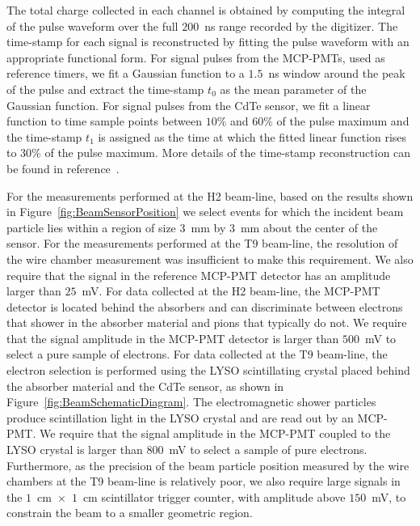 The total charge collected in each channel is obtained by computing the integral of the pulse
waveform over the full $200$~ns range recorded by the digitizer. 
The time-stamp for each signal is reconstructed by fitting the pulse waveform with
an appropriate functional form. For signal pulses from the MCP-PMTs, used as reference timers, 
we fit a Gaussian function to a $1.5$~ns window around the peak of the pulse and extract the 
time-stamp $t_{0}$ as the mean parameter of the Gaussian function. For signal pulses from the
CdTe sensor, we fit a linear function to time sample points between $10\%$ and $60\%$ of the pulse
maximum and the time-stamp $t_{1}$ is assigned as the time at which the fitted linear function
rises to $30\%$ of the pulse maximum. More details of the time-stamp reconstruction can be
found in reference~\cite{Anderson:2015gha}.


For the measurements performed at the H2 beam-line, 
based on the results shown in Figure~\ref{fig:BeamSensorPosition} we select events
for which the incident beam particle lies within a region of size $3$~mm by $3$~mm 
about the center of the sensor. For the measurements performed at the T9 beam-line,
the resolution of the wire chamber measurement was insufficient to make this 
requirement. We also require that the 
signal in the reference MCP-PMT detector has an amplitude larger than $25$~mV. 
For data collected at the H2 beam-line, the MCP-PMT detector is located behind
the absorbers and can discriminate between electrons that shower in the absorber
material and pions that typically do not. We require that the signal amplitude in the 
MCP-PMT detector is larger than $500$~mV to select a pure sample of electrons. For
data collected at the T9 beam-line, the electron selection is performed using
the LYSO scintillating crystal placed behind the absorber material and the CdTe sensor,
as shown in Figure~\ref{fig:BeamSchematicDiagram}. The electromagnetic shower particles produce
scintillation light in the LYSO crystal and are read out by an MCP-PMT. We require that
the signal amplitude in the MCP-PMT coupled to the LYSO crystal is larger than $800$~mV
to select a sample of pure electrons. Furthermore, as the precision of the beam particle position 
measured by the wire chambers at the T9 beam-line is relatively poor, we also require
large signals in the $1$~cm~$\times$~$1$~cm scintillator trigger counter, with
amplitude above $150$~mV, to constrain the beam to a smaller geometric region. 
